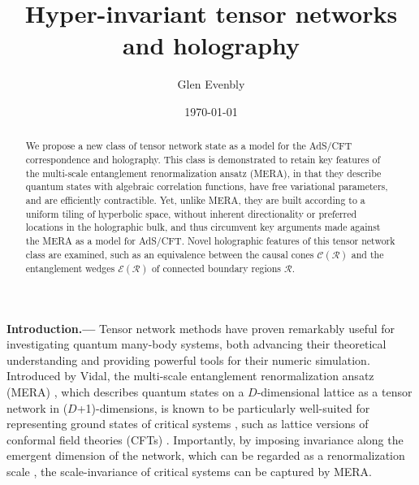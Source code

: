 \documentclass[aps,prl,twocolumn,showpacs,superscriptaddress,floatfix,10pt]{revtex4-1}
\def\E{{\mathcal E}}
\def\C{{\mathcal C}}
\def\R{{\mathcal R}}
\begin{document}
\title{Hyper-invariant tensor networks and holography}

\author{Glen Evenbly}
\date{\today}

\begin{abstract}
We propose a new class of tensor network state as a model for the AdS/CFT correspondence and holography. This class is demonstrated to retain key features of the multi-scale entanglement renormalization ansatz (MERA), in that they describe quantum states with algebraic correlation functions, have free variational parameters, and are efficiently contractible. Yet, unlike MERA, they are built according to a uniform tiling of hyperbolic space, without inherent directionality or preferred locations in the holographic bulk, and thus circumvent key arguments made against the MERA as a model for AdS/CFT. Novel holographic features of this tensor network class are examined, such as an equivalence between the causal cones $\C(\R)$ and the entanglement wedges $\E(\R)$ of connected boundary regions $\R$.
\end{abstract}

\maketitle

\textbf{Introduction.---} 
Tensor network methods \cite{Cirac09,Evenbly11a} have proven remarkably useful for investigating quantum many-body systems, both advancing their theoretical understanding and providing powerful tools for their numeric simulation. Introduced by Vidal, the multi-scale entanglement renormalization ansatz (MERA) \cite{Vidal08}, which describes quantum states on a $D$-dimensional lattice as a tensor network in ($D$+1)-dimensions, is known to be particularly well-suited for representing ground states of critical systems \cite{Gio08, Pfeifer09, Evenbly10d, Evenbly11b, Bridgeman15}, such as lattice versions of conformal field theories (CFTs) \cite{CFT1, CFT2}. Importantly, by imposing invariance along the emergent dimension of the network, which can be regarded as a renormalization scale \cite{ER}, the scale-invariance of critical systems can be captured by MERA.
\end{document}
